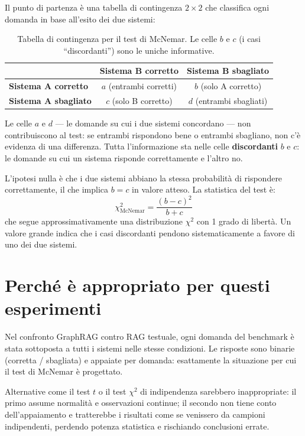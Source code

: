 \documentclass[11pt,a4paper]{report}
\begin{document}
Il punto di partenza è una tabella di contingenza $2 \times 2$ che
classifica ogni domanda in base all'esito dei due sistemi:

\begin{table}[H]
\centering
\begin{tabular}{lcc}
\toprule
 & \textbf{Sistema B corretto} & \textbf{Sistema B sbagliato} \\
\midrule
\textbf{Sistema A corretto} & $a$ (entrambi corretti)  & $b$ (solo A corretto) \\
\textbf{Sistema A sbagliato} & $c$ (solo B corretto) & $d$ (entrambi sbagliati) \\
\bottomrule
\end{tabular}
\caption{Tabella di contingenza per il test di McNemar. Le celle $b$ e $c$
(i casi ``discordanti'') sono le uniche informative.}
\end{table}

Le celle $a$ e $d$ --- le domande su cui i due sistemi concordano --- non
contribuiscono al test: se entrambi rispondono bene o entrambi sbagliano,
non c'è evidenza di una differenza. Tutta l'informazione sta nelle celle
\textbf{discordanti} $b$ e $c$: le domande su cui un sistema risponde
correttamente e l'altro no.

L'ipotesi nulla è che i due sistemi abbiano la stessa probabilità di
rispondere correttamente, il che implica $b = c$ in valore atteso. La
statistica del test è:
\[
\chi^2_{\text{McNemar}} = \frac{(b - c)^2}{b + c}
\]
che segue approssimativamente una distribuzione $\chi^2$ con 1 grado di
libertà. Un valore grande indica che i casi discordanti pendono
sistematicamente a favore di uno dei due sistemi.

\section{Perché è appropriato per questi esperimenti}

Nel confronto GraphRAG contro RAG testuale, ogni domanda del benchmark è
stata sottoposta a tutti i sistemi nelle stesse condizioni. Le risposte sono
binarie (corretta / sbagliata) e appaiate per domanda: esattamente la
situazione per cui il test di McNemar è progettato.

Alternative come il test $t$ o il test $\chi^2$ di indipendenza sarebbero
inappropriate: il primo assume normalità e osservazioni continue; il secondo
non tiene conto dell'appaiamento e tratterebbe i risultati come se venissero
da campioni indipendenti, perdendo potenza statistica e rischiando
conclusioni errate.
\end{document}
